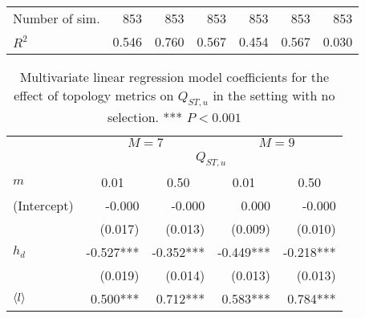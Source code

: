 \begin{table}
\begin{tabular}{lrrrrrr}
\midrule                                                                                                                                                                           
Number of sim. &                      853 &                      853 &                      853 &                      853 &                      853 &                      853 \\
$R^2$          &                    0.546 &                    0.760 &                    0.567 &                    0.454 &                    0.567 &                    0.030 \\
    \bottomrule
    \end{tabular}
  \label{tableSI:sett1_1var}
\end{table}
\FloatBarrier

\begin{table}
  \caption{ Multivariate linear regression model coefficients for the effect of topology metrics on $Q_{ST,u}$ in the setting with no selection. *** $P < 0.001$}
  \centering
  \begin{tabular}{lrrrr}
    \toprule
    &                                                    \multicolumn{2}{c}{$M=7$} & \multicolumn{2}{c}{$M=9$}                                         \\
    \cmidrule(lr){2-3} \cmidrule(lr){4-5} 
    &                                                    \multicolumn{4}{c}{$Q_{ST,u}$}                                                               \\
     \cmidrule(lr){2-5} 
$m$             & \multicolumn{1}{c}{0.01} & \multicolumn{1}{c}{0.50}  & \multicolumn{1}{c}{0.01} & \multicolumn{1}{c}{0.50} \\
    \hline 
    (Intercept) &                   -0.000 &                   -0.000 &                    0.000 &                   -0.000 \\       
                &                  (0.017) &                  (0.013) &                  (0.009) &                  (0.010) \\       
    $h_d$       &                -0.527*** &                -0.352*** &                -0.449*** &                -0.218*** \\       
                &                  (0.019) &                  (0.014) &                  (0.013) &                  (0.013) \\       
    $\langle l \rangle$        &                 0.500*** &                 0.712*** &                 0.583*** &                 0.784*** \\       

\end{tabular}
\end{table}
